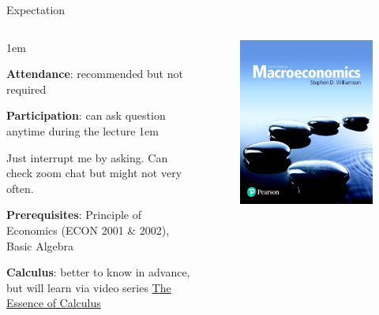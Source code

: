 \documentclass[11pt,aspectratio=43]{beamer}
\let\olditemize=\itemize
\let\endolditemize=\enditemize
\renewenvironment{itemize}{\olditemize \itemsep1em}{\endolditemize}
\theoremstyle{definition}
\begin{document}
\begin{frame}{Expectation}
\label{slide:Expectation}
    \begin{columns}
        \begin{column}{0.6\textwidth}
            \begin{itemize}
                \item \textbf{Attendance}: recommended but not required
                \item \textbf{Participation}: can ask question anytime during the lecture
                \begin{itemize}
                    \item Just interrupt me by asking. Can check zoom chat but might not very often.
                \end{itemize}
                \item \textbf{Prerequisites}: \alert{Principle of Economics}
                        (ECON 2001 \& 2002),
                        Basic Algebra
                \item \textbf{Calculus}: better to know in advance, but will learn via video series \alert{\href{https://www.youtube.com/watch?v=WUvTyaaNkzM&list=PLZHQObOWTQDMsr9K-rj53DwVRMYO3t5Yr}{The Essence of Calculus}}
            \end{itemize}
        \end{column}
        \begin{column}{0.4\textwidth}
            \begin{figure}
                \includegraphics[width=\textwidth]{./figures/Williamson.jpg}

\end{figure}
\end{column}
\end{columns}
\end{frame}
\end{document}
